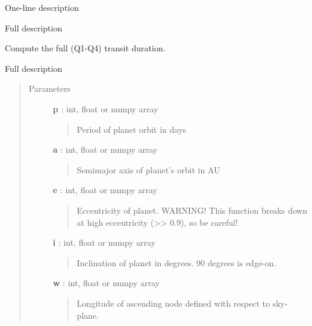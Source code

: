 \documentclass[letterpaper,10pt,english]{sphinxmanual}
\begin{document}

\begin{fulllineitems}
\label{index:simple_lib.transit_depth}
One-line description

Full description

\end{fulllineitems}


\begin{fulllineitems}
\label{index:simple_lib.transit_duration}
Compute the full (Q1-Q4) transit duration.

Full description
\begin{quote}\begin{description}
\item[{Parameters}] \leavevmode
\textbf{p} : int, float or numpy array
\begin{quote}

Period of planet orbit in days
\end{quote}

\textbf{a} : int, float or numpy array
\begin{quote}

Semimajor axis of planet's orbit in AU
\end{quote}

\textbf{e} : int, float or numpy array
\begin{quote}

Eccentricity of planet. WARNING! This function breaks down at
high eccentricity (\textgreater{}\textgreater{} 0.9), so be careful!
\end{quote}

\textbf{i} : int, float or numpy array
\begin{quote}

Inclination of planet in degrees. 90 degrees is edge-on.
\end{quote}

\textbf{w} : int, float or numpy array
\begin{quote}

Longitude of ascending node defined with respect to sky-plane.
\end{quote}


\end{description}
\end{quote}
\end{fulllineitems}
\end{document}
